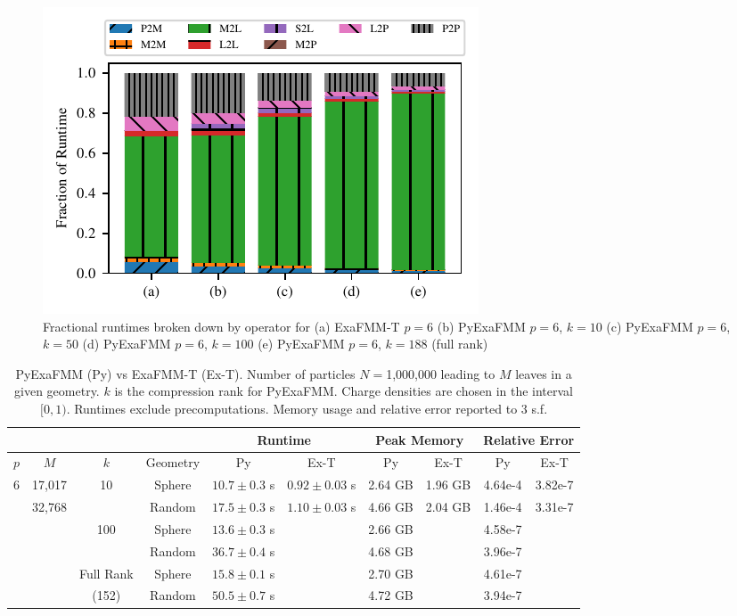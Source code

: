 \documentclass{IEEEcsmag}
\begin{document}
\begin{figure}
	\centerline{\includegraphics {figures/operator_runtimes.pdf}}
	\caption{Fractional runtimes broken down by operator for (a) ExaFMM-T $p=6$ (b) PyExaFMM $p=6$, $k=10$ (c) PyExaFMM $p=6$, $k=50$ (d) PyExaFMM $p=6$, $k=100$ (e) PyExaFMM $p=6$, $k=188$ (full rank)}
	\label{fig:operator_runtimes}
\end{figure}

\begin{table}
	\centering
	\caption{PyExaFMM (Py) vs ExaFMM-T (Ex-T). Number of particles $N=$1,000,000 leading to $M$ leaves in a given geometry. $k$ is the compression rank for PyExaFMM. Charge densities are chosen in the interval $[0, 1)$. Runtimes exclude precomputations. Memory usage and relative error reported to 3 s.f.}
	\begin{tabular*}{0.934\textwidth}{|*{10}{c|}}
		\hline
		& & &   & \multicolumn{2}{c|}{Runtime} & \multicolumn{2}{c|}{Peak Memory} & \multicolumn{2}{c|}{Relative Error}\\
		\hline
		$p$ & $M$ &$k$ &  Geometry   &   Py  &  Ex-T &    Py  &  Ex-T  &   Py  &  Ex-T\\
		\hline
		6 & 17,017 & 10 &   Sphere  &  $10.7 \pm 0.3$ s & $0.92 \pm 0.03$ s  &  2.64 GB  &  1.96 GB  & 4.64e-4 & 3.82e-7 \\
		 & 32,768 &    &   Random  &  $17.5 \pm 0.3$ s &  $1.10 \pm 0.03$ s &  4.66 GB  &  2.04 GB  & 1.46e-4 &  3.31e-7\\
		 & & 100   &   Sphere  &  $13.6 \pm 0.3$ s &   &  2.66 GB  &   & 4.58e-7 &  \\
		 & &    &   Random  &  $36.7 \pm 0.4$ s &  &  4.68 GB  &  & 3.96e-7 & \\
		 & & Full Rank  &   Sphere  &  $15.8 \pm 0.1$ s &   &  2.70 GB  &  & 4.61e-7 & \\
		 & & (152) &   Random  &  $50.5 \pm 0.7$ s &   &  4.72 GB  &  & 3.94e-7 & \\
		\hline
	\end{tabular*}
	\label{tab:performance}
 \end{table}
\end{document}
